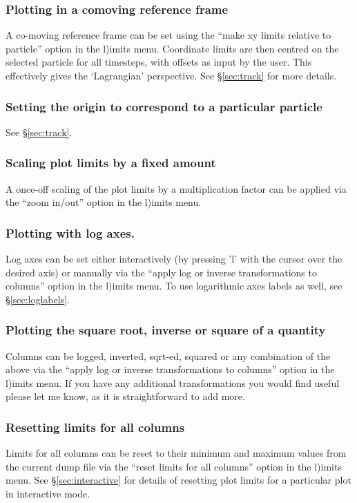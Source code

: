 \documentclass[a4paper,11pt]{article}
\begin{document}
\subsubsection{ Plotting in a comoving reference frame}
 A co-moving reference frame can be set using the ``make xy limits relative to particle'' option in the l)imits menu. Coordinate limits are then centred on the selected particle for all timesteps, with offsets as input by the user. This
effectively gives the `Lagrangian' perspective. See \S\ref{sec:track} for more details.

\subsubsection{ Setting the origin to correspond to a particular particle}
 See \S\ref{sec:track}.

\subsubsection{ Scaling plot limits by a fixed amount}
 A once-off scaling of the plot limits by a multiplication factor can be applied via the ``zoom in/out'' option in the l)imits menu.

\subsubsection{ Plotting with log axes.}
 Log axes can be set either interactively (by pressing 'l' with the cursor over the desired axis) or manually via the ``apply log or inverse transformations to columns'' option in the l)imits menu. To use logarithmic axes labels as well, see \S\ref{sec:loglabels}.

\subsubsection{ Plotting the square root, inverse or square of a quantity}
 Columns can be logged, inverted, sqrt-ed, squared or any combination of the above via the ``apply log or inverse transformations to columns'' option in the l)imits menu. If you have any additional transformations you would find useful please let me know, as it is straightforward to add more.

\subsubsection{ Resetting limits for all columns}
\label{sec:resetlimits}
 Limits for all columns can be reset to their minimum and maximum values from the current dump file via the ``reset limits for all columns'' option in the l)imits menu. See \S\ref{sec:interactive} for details of resetting plot limits for a particular plot in interactive mode. 
\end{document}
